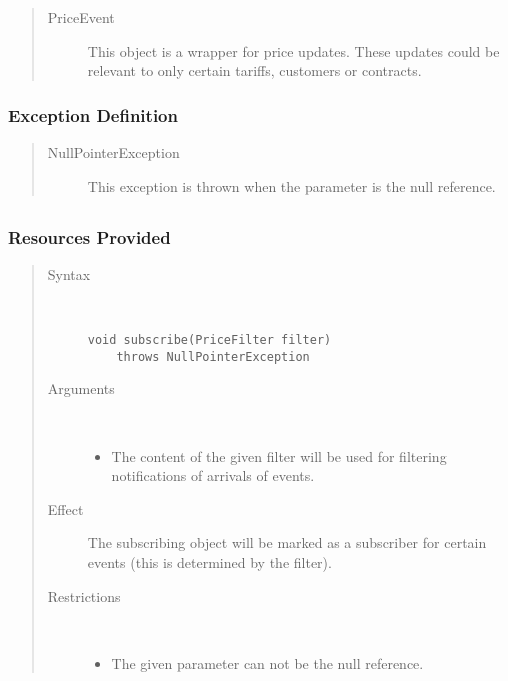 \begin{quote}
	\begin{description}
		\item[PriceEvent] This object is a wrapper for price updates. These updates
		could be relevant to only certain tariffs, customers or contracts.
	\end{description} 
\end{quote}

\subsubsection{Exception Definition} 

\begin{quote}
	\begin{description}
		\item[NullPointerException] This exception is thrown when the parameter
		is the null reference.
	\end{description} 
\end{quote}

\subsection{}

\subsubsection{Resources Provided}

\begin{quote}
	\begin{description}
		\item[Syntax] \
		\begin{verbatim}
void subscribe(PriceFilter filter)
    throws NullPointerException
		\end{verbatim}
		\item[Arguments] \
		\begin{itemize}
		  \item The content of the given filter will be used for filtering
		  notifications of arrivals of events.
		\end{itemize}
		\item[Effect] The subscribing object will be marked as a subscriber for
		certain events (this is determined by the filter).
		\item[Restrictions] \
		\begin{itemize}
		  \item The given parameter can not be the null reference.
		\end{itemize}
	\end{description} 
\end{quote}

